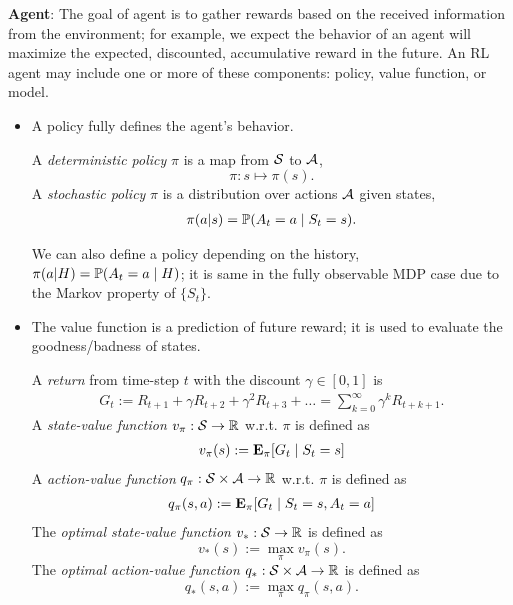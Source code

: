 \medspace

\textbf{Agent}: The goal of agent is to gather rewards based on the received information from the environment; for example, we expect the behavior of an agent will maximize the expected, discounted, accumulative reward in the future. An RL agent may include one or more of these components: policy, value function, or model.
\begin{itemize}
	\item 
	A policy fully defines the agent's behavior.
	\begin{definition}[Policy]
		A \textit{deterministic policy} $\pi$ is a map from $\mathcal{S}$ to $\mathcal{A}$,
		$$\pi: s \mapsto \pi(s).$$ 
		A \textit{stochastic policy} $\pi$ is a distribution over actions $\mathcal{A}$ given states,
		\begin{align*}
		\pi(a| s ) = \mathbb{P}(A_t = a \mid S_t = s).
		\end{align*}
	\end{definition}  
	\begin{remark}
		We can also define a policy depending on the history, $\pi(a| H ) = \mathbb{P}(A_t = a \mid H)$; it is same in the fully observable MDP case due to the Markov property of $\{S_t\}$.  
	\end{remark}
	\item The value function is a {prediction of future reward}; it is used to {evaluate the goodness/badness of states}.
	\begin{definition}A \textit{return} from time-step $t$ with the discount $\gamma \in [0,1]$ is
		\begin{align*}
		G_t := R_{t+1} + \gamma R_{t+2} + \gamma^2 R_{t+3}  + \dots = \sum_{k=0}^\infty \gamma^k R_{t+k+1}.
		\end{align*}
		A \textit{state-value function} $v_\pi: \mathcal{S} \to \mathbb{R}$ w.r.t. $\pi$ is defined as
		\begin{align*}
		v_\pi(s) := \mathbf{E}_\pi[ G_t \mid S_t = s ] 
		\end{align*} 
		A \textit{action-value function} $q_\pi: \mathcal{S} \times \mathcal{A} \to \mathbb{R}$ w.r.t. $\pi$  is defined as 
		\begin{align*}
		q_\pi(s,a) := \mathbf{E}_\pi[ G_t \mid S_t = s, A_t = a ]
		\end{align*}  
		The \textit{optimal state-value function} $v_\ast:\mathcal{S} \to \mathbb{R}$ is defined as 
		$$v_\ast(s) := \max_\pi v_\pi(s).$$
		The \textit{optimal action-value function} $q_\ast: \cal \mathcal{S} \times \mathcal{A} \to \mathbb{R}$ is defined as 
		$$q_\ast(s,a) := \max_\pi q_\pi(s,a).$$
	\end{definition}

\end{itemize}
